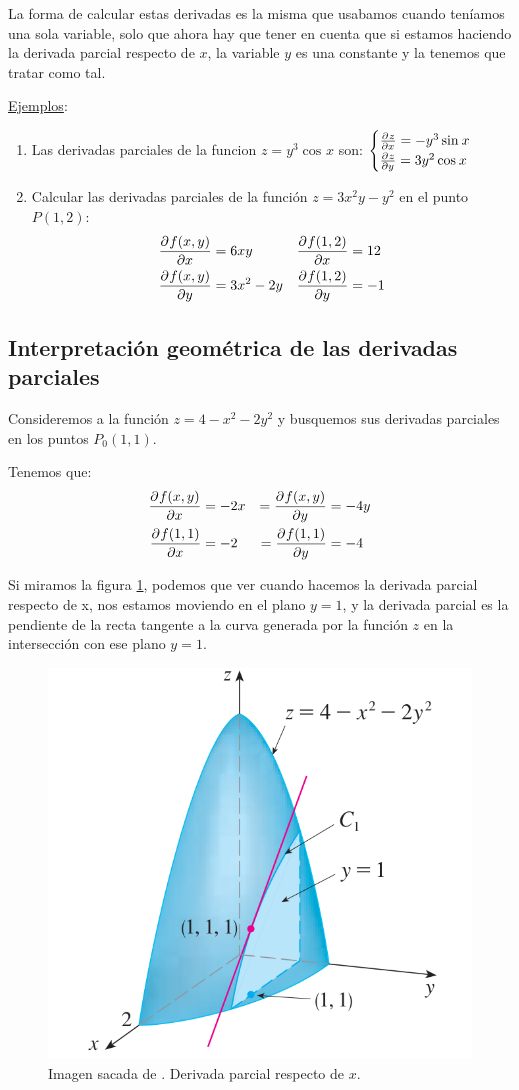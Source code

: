 \documentclass[12pt]{article}
\begin{document}
La forma de calcular estas derivadas es la misma que usabamos cuando teníamos una sola variable, solo que ahora hay que tener en cuenta que si estamos haciendo la derivada parcial respecto de $ x $, la variable $ y $ es una constante y la tenemos que tratar como tal.

\underline{Ejemplos}:
\begin{enumerate}[1.]
  \item Las derivadas parciales de la funcion $ z = y^{3}\cos^{}x $ son: 
	$
	\begin{cases}
	  \pdv[]{z}{x} = -y^{3}\sin^{}x \\
	  \pdv[]{z}{y} = 3y^{2}\cos^{}x
	\end{cases}
	$

  \item Calcular las derivadas parciales de la función $ z = 3x^{2}y - y^{2} $ en el punto $ P(1,2) $:
\begin{align*}
	\pdv[]{f(x,y)}{x} & = 6xy & \pdv[]{f(1,2)}{x} & = 12 \\ 
	\pdv[]{f(x,y)}{y} & = 3x^{2} - 2y & \pdv[]{f(1,2)}{y} & = -1 
\end{align*}
	  
\end{enumerate}


\subsection{Interpretación geométrica de las derivadas parciales}
Consideremos a la función $ z = 4 - x^{2} - 2y^{2} $ y busquemos sus derivadas parciales en los puntos $ P_{0}(1,1) $.

Tenemos que:
\begin{align*}
	\pdv[]{f(x,y)}{x} &= -2x &= \pdv[]{f(x,y)}{y} &= -4y\\
	\pdv[]{f(1,1)}{x} &= -2 &= \pdv[]{f(1,1)}{y} &= -4
\end{align*}

Si miramos la figura \ref{fig:derivada_parcial_x}, podemos que ver cuando hacemos la derivada parcial respecto de x, nos estamos moviendo en el plano $ y = 1 $, y la derivada parcial es la pendiente de la recta tangente a la curva generada por la función $ z $ en la intersección con ese plano $ y = 1 $.

\begin{figure}[H]
  \centering
  \includegraphics[width=0.3\linewidth]{imagenes/interp_geom_derivada_paracial_x.png}
  \caption{Imagen sacada de \parencite{stewart2}. Derivada parcial respecto de $ x $.}
  \label{fig:derivada_parcial_x}
\end{figure}
\end{document}
